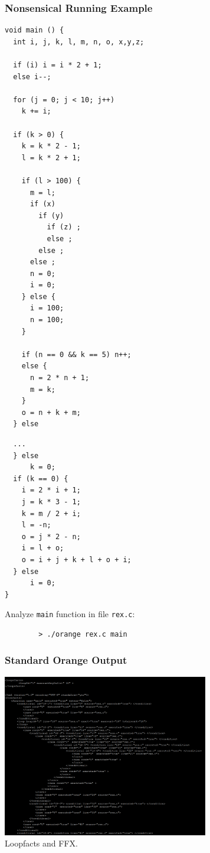 \documentclass{beamer}
\begin{document}
\begin{frame}[fragile]
  \frametitle{Nonsensical Running Example}
  {\tiny
  \begin{minipage}[t]{0.35\textwidth}
    \begin{verbatim}
void main () {
  int i, j, k, l, m, n, o, x,y,z;

  if (i) i = i * 2 + 1;
  else i--;

  for (j = 0; j < 10; j++)
    k += i;

  if (k > 0) {
    k = k * 2 - 1;
    l = k * 2 + 1;

    if (l > 100) {
      m = l;
      if (x) 
        if (y)
          if (z) ;
          else ;
        else ;
      else ;
      n = 0;
      i = 0;
    } else {
      i = 100;
      n = 100;
    } 

    if (n == 0 && k == 5) n++;
    else {
      n = 2 * n + 1;
      m = k;
    }
    o = n + k + m;
  } else 
    \end{verbatim}
  \end{minipage}
  }
  \begin{minipage}[t]{0.6\textwidth}
    {\tiny
    \begin{verbatim}
  ... 
  } else 
      k = 0;
  if (k == 0) {
    i = 2 * i + 1;
    j = k * 3 - 1;
    k = m / 2 + i;
    l = -n;
    o = j * 2 - n;
    i = l + o;
    o = i + j + k + l + o + i; 
  } else 
      i = 0;
}
    \end{verbatim}
    }

    \bigskip
    \begin{centering}
      Analyze {\tt main} function in file {\tt rex.c}: \\
      {\small
      \begin{verbatim}
        > ./orange rex.c main
      \end{verbatim}
      }
    \end{centering}
  \end{minipage}
\end{frame} 



\begin{frame}[fragile]
  \frametitle{Standard Orange Output}

  \begin{center}
    \includegraphics[width=9cm]{img/std_orange_out.pdf} \\
     Loopfacts and FFX. 
  \end{center}
\end{frame} 
\end{document}
